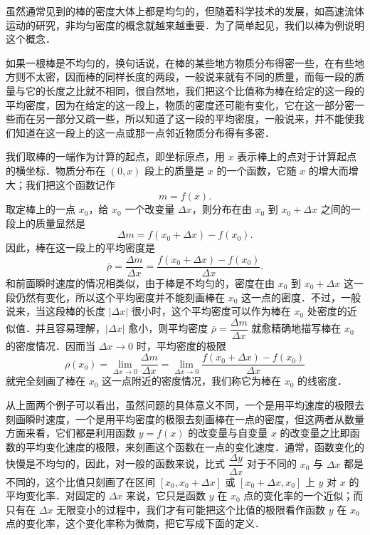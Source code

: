 虽然通常见到的棒的密度大体上都是均匀的，但随着科学技术的发展，如高速流体运动的研究，非均匀密度的概念就越来越重要．为了简单起见，我们以棒为例说明这个概念．

如果一根棒是不均匀的，换句话说，在棒的某些地方物质分布得密一些，在有些地方则不太密，因而棒的同样长度的两段，一般说来就有不同的质量，而每一段的质量与它的长度之比就不相同，很自然地，我们把这个比值称为棒在给定的这一段的平均密度，因为在给定的这一段上，物质的密度还可能有变化，它在这一部分密一些而在另一部分又疏一些，所以知道了这一段的平均密度，一般说来，并不能使我们知道在这一段上的这一点或那一点邻近物质分布得有多密．

我们取棒的一端作为计算的起点，即坐标原点，用 $x$ 表示棒上的点对于计算起点的横坐标．物质分布在 $(0,x)$ 段上的质量是 $x$ 的一个函数，它随 $x$ 的增大而增大；我们把这个函数记作
\[
m = f(x).
\]
取定棒上的一点 $x_0$，给 $x_0$ 一个改变量 $\Delta x$，则分布在由 $x_0$ 到 $x_0 + \Delta x$ 之间的一段上的质量显然是
\[
\Delta m = f\left(x_0+\Delta x\right) - f\left(x_0\right).
\]
因此，棒在这一段上的平均密度是
\[
\bar{\rho} = \frac{\Delta m}{\Delta x} = \frac{f\left(x_0+\Delta x\right) - f\left(x_0\right)}{\Delta x}.
\]
和前面瞬时速度的情况相类似，由于棒是不均匀的，密度在由 $x_0$ 到 $x_0 + \Delta x$ 这一段仍然有变化，所以这个平均密度并不能刻画棒在 $x_0$ 这一点的密度．不过，一般说来，当这段棒的长度 $\left|\Delta x\right|$ 很小时，这个平均密度可以作为棒在 $x_0$ 处密度的近似值．并且容易理解，$\left|\Delta x\right|$ 愈小，则平均密度 $\bar{\rho} = \dfrac{\Delta m}{\Delta x}$ 就愈精确地描写棒在 $x_0$ 的密度情况．因而当 $\Delta x \to 0$ 时，平均密度的极限
\[
\rho\left(x_0\right) = \lim_{\Delta x\to 0}\frac{\Delta m}{\Delta x} = \lim_{\Delta x\to 0}\frac{f\left(x_0+\Delta x\right) - f\left(x_0\right)}{\Delta x}
\]
就完全刻画了棒在 $x_0$ 这一点附近的密度情况，我们称它为棒在 $x_0$ 的线密度．

从上面两个例子可以看出，虽然问题的具体意义不同，一个是用平均速度的极限去刻画瞬时速度，一个是用平均密度的极限去刻画棒在一点的密度，但这两者从数量方面来看，它们都是利用函数 $y = f(x)$ 的改变量与自变量 $x$ 的改变量之比即函数的平均变化速度的极限，来刻画这个函数在一点的变化速度．通常，函数变化的快慢是不均匀的，因此，对一般的函数来说，比式 $\dfrac{\Delta y}{\Delta x}$ 对于不同的 $x_0$ 与 $\Delta x$ 都是不同的，这个比值只刻画了在区间 $[x_0, x_0+\Delta x]$ 或 $[x_0+\Delta x, x_0]$ 上 $y$ 对 $x$ 的平均变化率．对固定的 $\Delta x$ 来说，它只是函数 $y$ 在 $x_0$ 点的变化率的一个近似；而只有在 $\Delta x$ 无限变小的过程中，我们才有可能把这个比值的极限看作函数 $y$ 在 $x_0$ 点的变化率，这个变化率称为微商，把它写成下面的定义．


